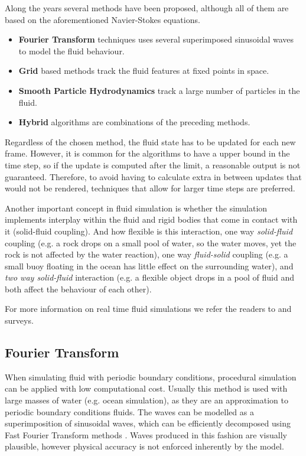Along the years several methods have been proposed, although all of them are based on the aforementioned Navier-Stokes equations.

\begin{itemize}
\item \textbf{Fourier Transform} techniques uses several superimposed sinusoidal waves to model the fluid behaviour.
\item \textbf{Grid} based methods track the fluid features at fixed points in space.
\item \textbf{Smooth Particle Hydrodynamics} track a large number of particles in the fluid.
\item \textbf{Hybrid} algorithms are combinations of the preceding methods.
\end{itemize}

Regardless of the chosen method, the fluid state has to be updated for each new frame.
However, it is common for the algorithms to have a upper bound in the time step, so if the update is computed after the limit, a reasonable output is not guaranteed.
Therefore, to avoid having to calculate extra in between updates that would not be rendered, techniques that allow for larger time steps are preferred.  

Another important concept in fluid simulation is whether the simulation implements interplay within the fluid and rigid bodies that come in contact with it (solid-fluid coupling).
And how flexible is this interaction, one way \emph{solid-fluid} coupling (e.g. a rock drops on a small pool of water, so the water moves, yet the rock is not affected by the water reaction), one way \emph{fluid-solid} coupling (e.g. a small buoy floating in the ocean has little effect on the surrounding water), and \emph{two way solid-fluid} interaction (e.g. a flexible object drops in a pool of fluid and both affect the behaviour of each other).

For more information on real time fluid simulations we refer the readers to \cite{Vines2012} and \cite{Ihmsen2014} surveys.

\subsection{Fourier Transform}

When simulating fluid with periodic boundary conditions, procedural simulation can be applied with low computational cost.
Usually this method is used with large masses of water (e.g. ocean simulation), as they are an approximation to periodic boundary conditions fluids.
The waves can be modelled as a superimposition of sinusoidal waves, which can be efficiently decomposed using Fast Fourier Transform methods \cite{Mastin1987}.
Waves produced in this fashion are visually plausible, however physical accuracy is not enforced inherently by the model.

